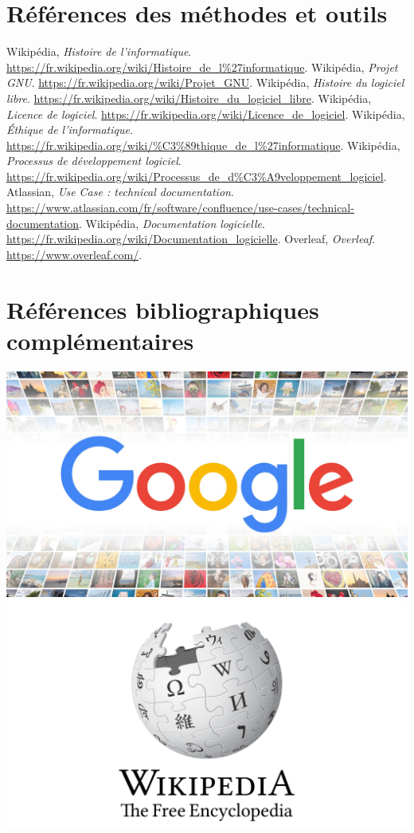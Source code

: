 \section{Références des méthodes et outils}
\begin{thebibliography}{9}
\setlength{\itemsep}{0pt}
 Wikipédia, \textit{Histoire de l'informatique}. \url{https://fr.wikipedia.org/wiki/Histoire_de_l%27informatique}.
 Wikipédia, \textit{Projet GNU}. \url{https://fr.wikipedia.org/wiki/Projet_GNU}.
 Wikipédia, \textit{Histoire du logiciel libre}. \url{https://fr.wikipedia.org/wiki/Histoire_du_logiciel_libre}.
 Wikipédia, \textit{Licence de logiciel}. \url{https://fr.wikipedia.org/wiki/Licence_de_logiciel}.
 Wikipédia, \textit{Éthique de l'informatique}. \url{https://fr.wikipedia.org/wiki/%C3%89thique_de_l%27informatique}.
 Wikipédia, \textit{Processus de développement logiciel}. \url{https://fr.wikipedia.org/wiki/Processus_de_d%C3%A9veloppement_logiciel}.
 Atlassian, \textit{Use Case : technical documentation}. \url{https://www.atlassian.com/fr/software/confluence/use-cases/technical-documentation}.
 Wikipédia, \textit{Documentation logicielle}. \url{https://fr.wikipedia.org/wiki/Documentation_logicielle}.
 Overleaf, \textit{Overleaf}. \url{https://www.overleaf.com/}.
\end{thebibliography}

\newpage
\section{Références bibliographiques complémentaires}
\includegraphics[width=0.5\linewidth]{Images_bibliographiques/google_img.jpg}\hspace{1.5cm} \includegraphics[width=0.5\linewidth]{Images_bibliographiques/Wiki_img.jpg}
